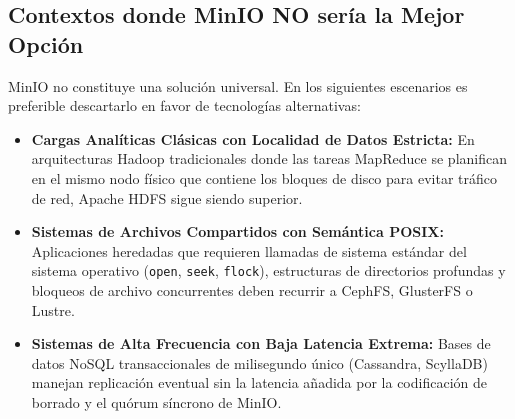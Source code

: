 \documentclass[12pt,a4paper]{article}
\begin{document}
\subsection{Contextos donde MinIO NO sería la Mejor Opción}
MinIO no constituye una solución universal. En los siguientes escenarios es preferible descartarlo en favor de tecnologías alternativas:
\begin{itemize}[leftmargin=*]
    \item \textbf{Cargas Analíticas Clásicas con Localidad de Datos Estricta:} En arquitecturas Hadoop tradicionales donde las tareas MapReduce se planifican en el mismo nodo físico que contiene los bloques de disco para evitar tráfico de red, Apache HDFS sigue siendo superior.
    \item \textbf{Sistemas de Archivos Compartidos con Semántica POSIX:} Aplicaciones heredadas que requieren llamadas de sistema estándar del sistema operativo (\texttt{open}, \texttt{seek}, \texttt{flock}), estructuras de directorios profundas y bloqueos de archivo concurrentes deben recurrir a CephFS, GlusterFS o Lustre.
    \item \textbf{Sistemas de Alta Frecuencia con Baja Latencia Extrema:} Bases de datos NoSQL transaccionales de milisegundo único (Cassandra, ScyllaDB) manejan replicación eventual sin la latencia añadida por la codificación de borrado y el quórum síncrono de MinIO.
\end{itemize}

\end{document}
